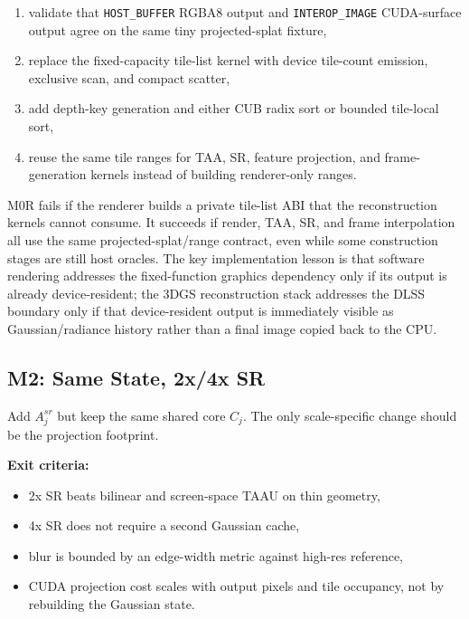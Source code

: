 \documentclass[11pt]{article}
\begin{document}
\begin{enumerate}
  \item validate that \texttt{HOST\_BUFFER} RGBA8 output and
        \texttt{INTEROP\_IMAGE} CUDA-surface output agree on the same tiny
        projected-splat fixture,
  \item replace the fixed-capacity tile-list kernel with device tile-count
        emission, exclusive scan, and compact scatter,
  \item add depth-key generation and either CUB radix sort or bounded tile-local
        sort,
  \item reuse the same tile ranges for TAA, SR, feature projection, and
        frame-generation kernels instead of building renderer-only ranges.
\end{enumerate}

M0R fails if the renderer builds a private tile-list ABI that the
reconstruction kernels cannot consume. It succeeds if render, TAA, SR, and
frame interpolation all use the same projected-splat/range contract, even while
some construction stages are still host oracles. The key implementation lesson
is that software rendering addresses the fixed-function graphics dependency
only if its output is already device-resident; the 3DGS reconstruction stack
addresses the DLSS boundary only if that device-resident output is immediately
visible as Gaussian/radiance history rather than a final image copied back to
the CPU.

\subsection{M2: Same State, 2x/4x SR}

Add $A_j^{sr}$ but keep the same shared core $C_j$. The only scale-specific
change should be the projection footprint.

\textbf{Exit criteria:}

\begin{itemize}
  \item 2x SR beats bilinear and screen-space TAAU on thin geometry,
  \item 4x SR does not require a second Gaussian cache,
  \item blur is bounded by an edge-width metric against high-res reference,
  \item CUDA projection cost scales with output pixels and tile occupancy, not
        by rebuilding the Gaussian state.
\end{itemize}
\end{document}
